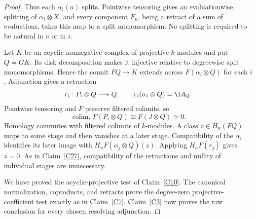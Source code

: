 \begin{proof}
Thus each $\alpha_i(a)$ splits. Pointwise tensoring gives an evaluationwise splitting of $\alpha_i\otimes X$, and every component $F_n$, being a retract of a sum of evaluations, takes this map to a split monomorphism. No splitting is required to be natural in $a$ or in $i$.

Let $K$ be an acyclic nonnegative complex of projective $k$-modules and put $Q=GK$. Its disk decomposition makes it injective relative to degreewise split monomorphisms. Hence the counit $FQ\to K$ extends across $F(\alpha_i\otimes Q)$ for each $i$. Adjunction gives a retraction
\[
 r_i:P_i\otimes Q\longrightarrow Q,
 \qquad r_i(\alpha_i\otimes Q)=\id_Q.
\]
Pointwise tensoring and $F$ preserve filtered colimits, so
\[
 \operatorname{colim}_i F(P_i\otimes Q)
 \cong F(J\otimes Q)\simeq0.
\]
Homology commutes with filtered colimits of $k$-modules. A class $z\in H_n(FQ)$ maps to some stage and then vanishes at a later stage. Compatibility of the $\alpha_i$ identifies its later image with $H_nF(\alpha_j\otimes Q)(z)$. Applying $H_nF(r_j)$ gives $z=0$. As in Claim~\ref{C27}, compatibility of the retractions and nullity of individual stages are unnecessary.

We have proved the acyclic-projective test of Claim~\ref{C10}. The canonical normalization, coproducts, and retracts prove the degree-zero projective-coefficient test exactly as in Claim~\ref{C7}. Claim~\ref{C3} now proves the raw conclusion for every chosen resolving adjunction.
\end{proof}
